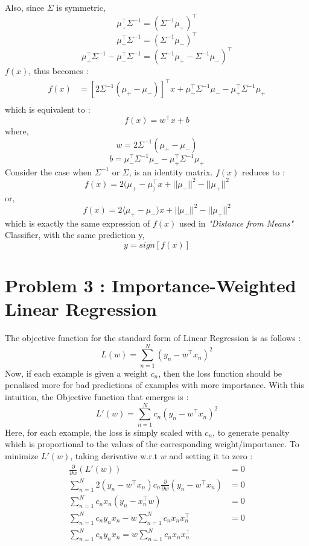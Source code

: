 \documentclass{article}
\begin{document}
Also, since $\Sigma$ is symmetric, $$\mu_+^\top \Sigma^{-1} = (\Sigma^{-1}\mu_+)^\top $$ $$\mu_-^\top \Sigma^{-1} = (\Sigma^{-1}\mu_-)^\top $$ $$\mu_+^\top \Sigma^{-1} - \mu_-^\top \Sigma^{-1} = (\Sigma^{-1}\mu_+ - \Sigma^{-1}\mu_-)^\top $$
$f(x)$, thus becomes :
\begin{equation*}
\begin{aligned}
f(x) &= [2\Sigma^{-1}(\mu_+ - \mu_-)]^\top x + \mu_-^\top \Sigma^{-1}\mu_- - \mu_+^\top \Sigma^{-1}\mu_+ \\
\end{aligned}
\end{equation*}
which is equivalent to :
$$f(x) = w^\top x+ b$$
where,
$$w = 2\Sigma^{-1}(\mu_+ - \mu_-)$$
$$b = \mu_-^\top \Sigma^{-1}\mu_- - \mu_+^\top \Sigma^{-1}\mu_+$$
Consider the case when $\Sigma^{-1}$ or $\Sigma$, is an identity matrix. $f(x)$ reduces to :
$$f(x)= 2(\mu_+ - \mu_)^\top x + ||\mu_-||^2 - ||\mu_+||^2$$ 
or,
$$f(x)= 2\langle\mu_+ - \mu_-\rangle x + ||\mu_-||^2 - ||\mu_+||^2$$ 
which is exactly the same expression of $f(x)$ used in \emph{"Distance from Means"} Classifier, with the same prediction y,
$$y = sign[f(x)]$$
\section{Problem 3 : Importance-Weighted Linear Regression}
The objective function for the standard form of Linear Regression is as follows :
$$L(w) = \sum_{n=1}^N (y_n-w^\top x_n)^2$$
Now, if each example is given a weight $c_n$, then the loss function should be penalised more for bad predictions of examples with more importance. With this intuition, the Objective function that emerges is :
$$L'(w) = \sum_{n=1}^N c_n(y_n-w^\top x_n)^2$$
Here, for each example, the loss is simply scaled with $c_n$, to generate penalty which is proportional to the values of the corresponding weight/importance. To minimize $L'(w)$, taking derivative w.r.t $w$ and setting it to zero :
\begin{equation*}
\begin{aligned}
\frac{\partial}{\partial w}(L'(w)) &= 0 \\
\sum_{n=1}^N 2(y_n-w^\top x_n)c_n\frac{\partial}{\partial w}(y_n-w^\top x_n) &= 0\\
\sum_{n=1}^N c_nx_n(y_n-x_n^\top w) &= 0\\
\sum_{n=1}^N c_ny_nx_n-w\sum_{n=1}^Nc_nx_nx_n^\top  &= 0 \\
\sum_{n=1}^N c_ny_nx_n = w\sum_{n=1}^Nc_nx_nx_n^\top \\
\end{aligned}
\end{equation*}
\end{document}
